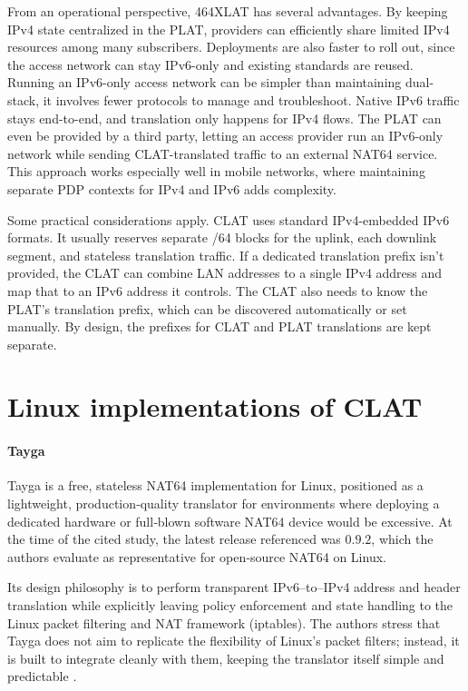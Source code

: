 From an operational perspective, 464XLAT has several advantages. By keeping IPv4 state centralized in the PLAT, providers can efficiently share limited IPv4 resources among many subscribers. Deployments are also faster to roll out, since the access network can stay IPv6-only and existing standards are reused. Running an IPv6-only access network can be simpler than maintaining dual-stack, it involves fewer protocols to manage and troubleshoot. Native IPv6 traffic stays end-to-end, and translation only happens for IPv4 flows. The PLAT can even be provided by a third party, letting an access provider run an IPv6-only network while sending CLAT-translated traffic to an external NAT64 service. This approach works especially well in mobile networks, where maintaining separate PDP contexts for IPv4 and IPv6 adds complexity\cite{rfc6877}.

Some practical considerations apply. CLAT uses standard IPv4-embedded IPv6 formats. It usually reserves separate /64 blocks for the uplink, each downlink segment, and stateless translation traffic. If a dedicated translation prefix isn’t provided, the CLAT can combine LAN addresses to a single IPv4 address and map that to an IPv6 address it controls. The CLAT also needs to know the PLAT’s translation prefix, which can be discovered automatically or set manually. By design, the prefixes for CLAT and PLAT translations are kept separate\cite{rfc6877}.


\section{Linux implementations of CLAT}

\paragraph{Tayga} 



Tayga is a free, stateless NAT64 implementation for Linux, positioned as a lightweight, production‑quality translator for environments where deploying a dedicated hardware or full‑blown software NAT64 device would be excessive\cite{Repas_Farnadi_Lencse_2014}. At the time of the cited study, the latest release referenced was $0.9.2$, which the authors evaluate as representative for open‑source NAT64 on Linux\cite{palrd_tayga_readme}.

Its design philosophy is to perform transparent IPv6–to–IPv4 address and header translation while explicitly leaving policy enforcement and state handling to the Linux packet filtering and NAT framework (iptables)\cite{Repas_Farnadi_Lencse_2014}. The authors stress that Tayga does not aim to replicate the flexibility of Linux’s packet filters; instead, it is built to integrate cleanly with them, keeping the translator itself simple and predictable \cite{Repas_Farnadi_Lencse_2014}.

